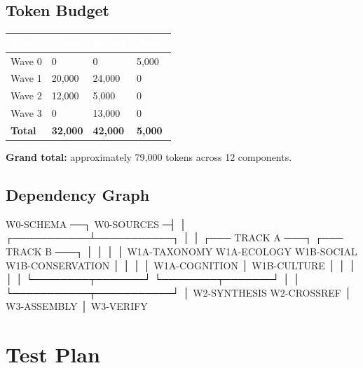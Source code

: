 \documentclass[11pt,letterpaper]{article}
\newcommand{\tableheader}[1]{\textbf{\sffamily\textcolor{white}{#1}}}
\begin{document}
\subsection{Token Budget}

\begin{center}
\begin{tabularx}{\textwidth}{L{3cm}C{2cm}C{2cm}C{2.5cm}}
\toprule
{}
\tableheader{Wave} & \tableheader{Opus} & \tableheader{Sonnet} & \tableheader{Haiku} \\
\midrule
Wave 0 & 0 & 0 & 5,000 \\
Wave 1 & 20,000 & 24,000 & 0 \\
Wave 2 & 12,000 & 5,000 & 0 \\
Wave 3 & 0 & 13,000 & 0 \\
\midrule
\textbf{Total} & \textbf{32,000} & \textbf{42,000} & \textbf{5,000} \\
\bottomrule
\end{tabularx}
\end{center}

\textbf{Grand total:} approximately 79,000 tokens across 12 components.

\subsection{Dependency Graph}

\begin{asciibox}
                    W0-SCHEMA ──┐
                    W0-SOURCES ─┤
                                │
                    ┌───────────┴───────────┐
                    │                       │
          ┌─── TRACK A ───┐      ┌─── TRACK B ───┐
          │                │      │                │
     W1A-TAXONOMY    W1A-ECOLOGY  W1B-SOCIAL  W1B-CONSERVATION
          │                │      │                │
     W1A-COGNITION         │      W1B-CULTURE      │
          │                │      │                │
          └────────┬───────┘      └────────┬───────┘
                   │                       │
                   └───────────┬───────────┘
                               │
                         W2-SYNTHESIS
                         W2-CROSSREF
                               │
                         W3-ASSEMBLY
                               │
                         W3-VERIFY
\end{asciibox}

\section{Test Plan}
\end{document}

